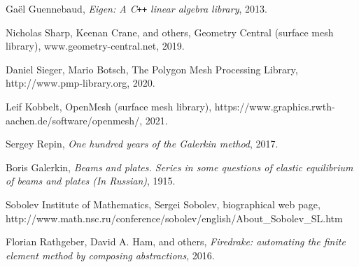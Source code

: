 \documentclass[11pt,a4paper]{memoir}
\begin{document}
\begin{thebibliography}{9}
Ga\"el Guennebaud,
\textit{Eigen: A C\texttt{++} linear algebra library},
2013.

Nicholas Sharp, Keenan Crane, and others,
Geometry Central (surface mesh library), www.geometry-central.net,
2019.

Daniel Sieger, Mario Botsch,
The Polygon Mesh Processing Library,
http://www.pmp-library.org,
2020.

Leif Kobbelt,
OpenMesh (surface mesh library),
https://www.graphics.rwth-aachen.de/software/openmesh/,
2021.

Sergey Repin,
\textit{One hundred  years of the Galerkin method},
2017.

Boris Galerkin,
\textit{Beams and plates. Series in some questions of elastic equilibrium of beams and plates (In Russian)},
1915.

Sobolev Institute of Mathematics,
Sergei Sobolev, biographical web page,
http://www.math.nsc.ru/conference/sobolev/english/About\_Sobolev\_SL.htm

Florian Rathgeber, David A. Ham, and others,
\textit{Firedrake: automating the finite element method by composing abstractions},
2016.


\end{thebibliography}
\end{document}
